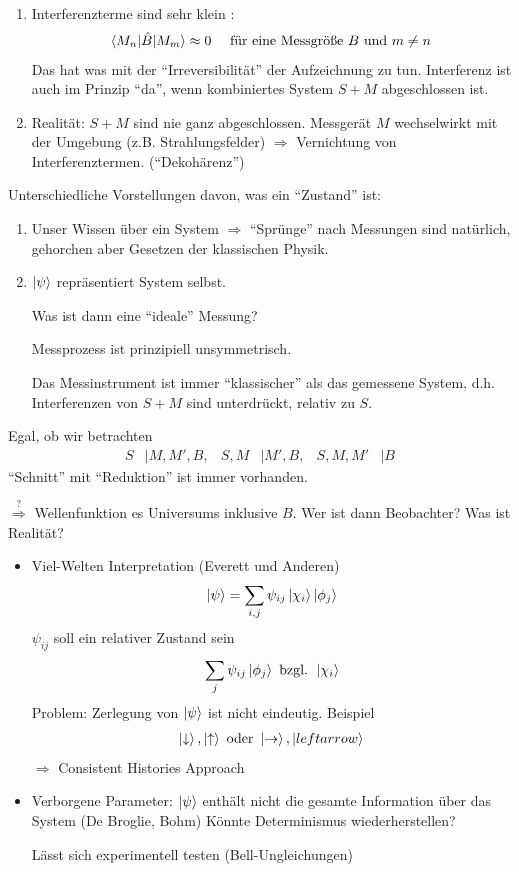 	\begin{enumerate}[1)]
		\item Interferenzterme sind sehr klein :
			\begin{align*}
				\braket{M_n | \hat{B} | M_m} &\approx 0 &\text{ für eine Messgröße }B \text{ und } m\neq n
			\end{align*}
			Das hat was mit der ``Irreversibilität'' der Aufzeichnung zu tun. Interferenz ist auch im Prinzip ``da'', wenn kombiniertes System $S + M$ abgeschlossen ist.
		\item Realität: $S + M$ sind nie ganz abgeschlossen. Messgerät $M$ wechselwirkt mit der Umgebung (z.B. Strahlungsfelder) $\Rightarrow$ Vernichtung von Interferenztermen. (``Dekohärenz'')
	\end{enumerate}
Unterschiedliche Vorstellungen davon, was ein ``Zustand'' ist:
	\begin{enumerate}[1)]
		\item Unser Wissen über ein System $\Rightarrow$ ``Sprünge'' nach Messungen sind natürlich, gehorchen aber Gesetzen der klassischen Physik.
		\item $\ket{\psi}$ repräsentiert System selbst.
		
		Was ist dann eine ``ideale'' Messung?
		
		Messprozess ist prinzipiell unsymmetrisch.
		
		Das Messinstrument ist immer ``klassischer'' als das gemessene System, d.h. Interferenzen von $S + M$ sind unterdrückt, relativ zu $S$. 
	\end{enumerate}	 
Egal, ob wir betrachten 
	\begin{align*}
		S &| M, M', B ,& S , M&| M', B ,& S, M, M'&| B
	\end{align*}
``Schnitt'' mit ``Reduktion'' ist immer vorhanden.

$\overset{?}{\Rightarrow}$ Wellenfunktion es Universums inklusive $B$. Wer ist dann Beobachter? Was ist Realität?
	\begin{itemize}
		\item Viel-Welten Interpretation (Everett und Anderen)
			\begin{align*}
				\ket{\psi} = \sum_{i,j} \psi_{ij} \ket{\chi_i} \ket{\phi_j}
			\end{align*}
		$\psi_{ij}$ soll ein relativer Zustand sein
			\begin{align*}
				\sum_j \psi_{ij} \ket{\phi_j} \text{ bzgl. } \ket{\chi_i}
			\end{align*}
		Problem: Zerlegung von $\ket{\psi}$ ist nicht eindeutig. Beispiel
			\begin{align*}
				\ket{\downarrow}, \ket{\uparrow} \text{ oder } \ket{\rightarrow}, \ket{leftarrow} 
			\end{align*}
		$\Rightarrow$ Consistent Histories Approach
		\item Verborgene Parameter: $\ket{\psi}$ enthält nicht die gesamte Information über das System (De Broglie, Bohm) Könnte Determinismus wiederherstellen?
		
		Lässt sich experimentell testen (Bell-Ungleichungen)
	\end{itemize}